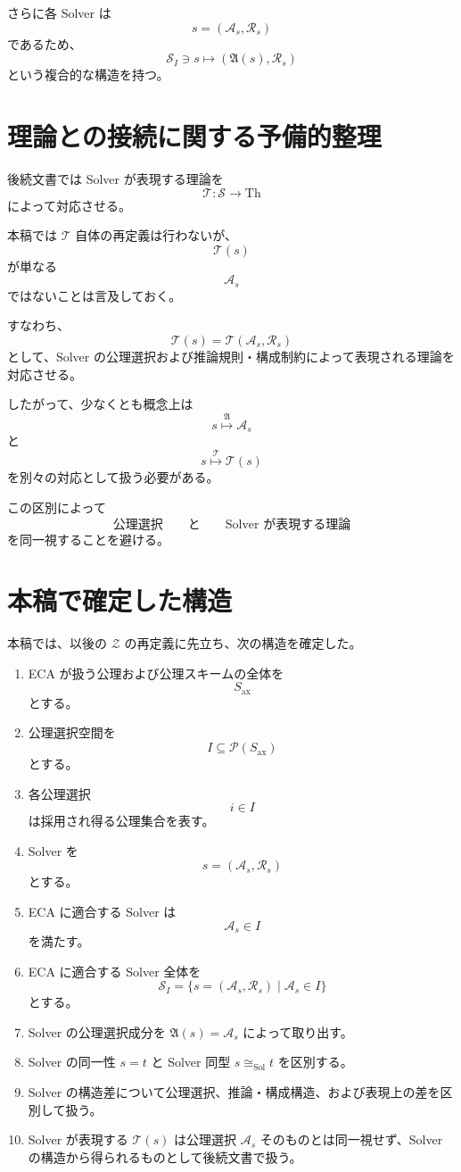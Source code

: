 \documentclass[a4paper,11pt]{jsarticle}
\newcommand{\Solver}{\mathcal{S}}
\newcommand{\Ax}{S_{\mathrm{ax}}}
\newcommand{\Sel}{I}
\newcommand{\Th}{\mathrm{Th}}
\begin{document}
さらに各 Solver は
\[
s=(\mathcal{A}_s,\mathcal{R}_s)
\]
であるため、
\[
\boxed{
\Solver_{\Sel}
\ni s
\longmapsto
\left(
\mathfrak{A}(s),\mathcal{R}_s
\right)
}
\]
という複合的な構造を持つ。

\section{理論との接続に関する予備的整理}

後続文書では Solver が表現する理論を
\[
\mathcal{T}:\Solver\longrightarrow\Th
\]
によって対応させる。

本稿では $\mathcal{T}$ 自体の再定義は行わないが、
\[
\mathcal{T}(s)
\]
が単なる
\[
\mathcal{A}_s
\]
ではないことは言及しておく。

すなわち、
\[
\boxed{
\mathcal{T}(s)
=
\mathcal{T}(\mathcal{A}_s,\mathcal{R}_s)
}
\]
として、Solver の公理選択および推論規則・構成制約によって表現される理論を対応させる。

したがって、少なくとも概念上は
\[
s
\overset{\mathfrak{A}}{\longmapsto}
\mathcal{A}_s
\]
と
\[
s
\overset{\mathcal{T}}{\longmapsto}
\mathcal{T}(s)
\]
を別々の対応として扱う必要がある。

この区別によって
\[
\text{公理選択} \qquad \text{と} \qquad \text{Solver が表現する理論}
\]
を同一視することを避ける。

\section{本稿で確定した構造}

本稿では、以後の $\mathcal{Z}$ の再定義に先立ち、次の構造を確定した。

\begin{enumerate}
\item ECA が扱う公理および公理スキームの全体を
\[
\Ax
\]
とする。

\item 公理選択空間を
\[
\Sel\subseteq\mathcal{P}(\Ax)
\]
とする。

\item 各公理選択
\[
i\in\Sel
\]
は採用され得る公理集合を表す。

\item Solver を
\[
s=(\mathcal{A}_s,\mathcal{R}_s)
\]
とする。

\item ECA に適合する Solver は
\[
\mathcal{A}_s\in\Sel
\]
を満たす。

\item ECA に適合する Solver 全体を
\[
\Solver_{\Sel}
=
\{s=(\mathcal{A}_s,\mathcal{R}_s)\mid
\mathcal{A}_s\in\Sel\}
\]
とする。

\item Solver の公理選択成分を $\mathfrak{A}(s)=\mathcal{A}_s$ によって取り出す。
\item Solver の同一性 $s=t$ と Solver 同型 $s\cong_{\mathrm{Sol}}t$ を区別する。
\item Solver の構造差について公理選択、推論・構成構造、および表現上の差を区別して扱う。
\item Solver が表現する $\mathcal{T}(s)$ は公理選択 $\mathcal{A}_s$ そのものとは同一視せず、Solver の構造から得られるものとして後続文書で扱う。
\end{enumerate}
\end{document}
